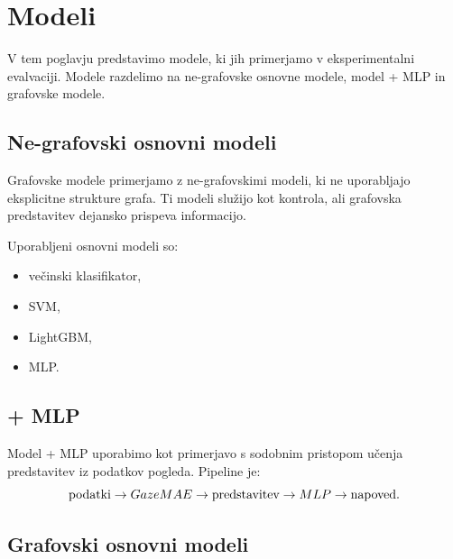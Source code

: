 \chapter{Modeli}
\label{sec:modeli}

V tem poglavju predstavimo modele, ki jih primerjamo v eksperimentalni evalvaciji.
Modele razdelimo na ne-grafovske osnovne modele, model \GazeMAE{} + MLP in grafovske modele.

\section{Ne-grafovski osnovni modeli}
\label{subsec:baseline-modeli}

Grafovske modele primerjamo z ne-grafovskimi modeli, ki ne uporabljajo eksplicitne strukture grafa.
Ti modeli služijo kot kontrola, ali grafovska predstavitev dejansko prispeva informacijo.

Uporabljeni osnovni modeli so:
\begin{itemize}
    \item večinski klasifikator,
    \item SVM,
    \item LightGBM,
    \item MLP.
\end{itemize}


\section{\GazeMAE{} + MLP}
\label{subsec:gazemae-model}

Model \GazeMAE{} + MLP uporabimo kot primerjavo s sodobnim pristopom učenja predstavitev iz podatkov pogleda.
Pipeline je:
\begin{equation}
    \text{podatki} \rightarrow GazeMAE{} \rightarrow \text{predstavitev} \rightarrow MLP{} \rightarrow \text{napoved}.
\end{equation}


\section{Grafovski osnovni modeli}
\label{subsec:gnn-baselines}

